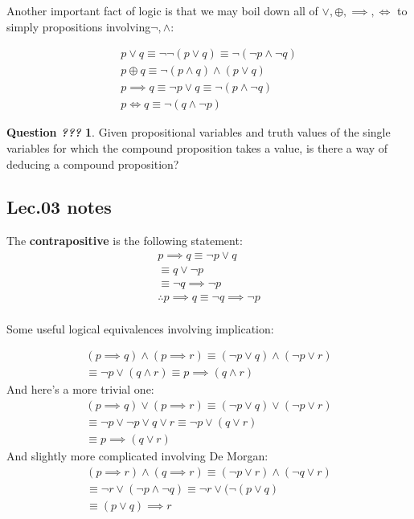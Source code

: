 \documentclass{article}
\theoremstyle{definition}
\newtheorem{question}{Question \textit{???}}
\begin{document}
Another important fact of logic is that we may boil down all of $\lor, \oplus, \implies, \iff$ to simply propositions involving$\neg, \land$: 

\begin{align*}
    p \lor q \equiv \neg \neg (p \lor q) \equiv \neg(\neg p \land \neg q)\\
    p \oplus q \equiv \neg(p \land q) \land (p \lor q)\\
    p \implies q \equiv \neg p \lor q \equiv \neg (p \land \neg q)\\
    p \iff q \equiv \neg (q \land \neg p)
\end{align*}


\begin{question}
Given propositional variables and truth values of the single variables for which the compound proposition takes a value, is there a way of deducing a compound proposition? 
\end{question}

\subsection{Lec.03 notes}

The \textbf{contrapositive} is the following statement:
\begin{align*}
    p \implies q \equiv \neg p \lor q\\
    \equiv q \lor \neg p\\
    \equiv \neg q \implies \neg p\\
    \therefore p \implies q \equiv \neg q \implies \neg p
\end{align*}
\\
Some useful logical equivalences involving implication:

\begin{align*}
    (p \implies q) \land (p \implies r) \equiv (\neg p \lor q) \land (\neg p \lor r)\\
    \equiv \neg p \lor (q \land r) \equiv p \implies (q \land r)
\end{align*}
And here's a more trivial one: 
\begin{align*}
    (p \implies q) \lor (p \implies r) \equiv (\neg p \lor q) \lor (\neg p \lor r)\\
    \equiv \neg p \lor \neg p \lor q \lor r \equiv \neg p \lor (q \lor r)\\
    \equiv p \implies (q \lor r)
\end{align*}
And slightly more complicated involving De Morgan:
\begin{align*}
    (p \implies r) \land (q \implies r) \equiv (\neg p \lor r) \land (\neg q \lor r)\\
    \equiv \neg r \lor (\neg p \land \neg q) \equiv \neg r \lor (\neg(p \lor q)\\
    \equiv (p \lor q) \implies r 
\end{align*}
\end{document}
